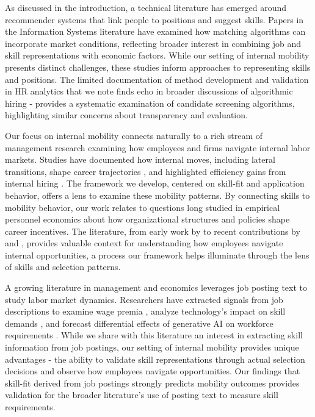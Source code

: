 \documentclass{article}
\begin{document}
As discussed in the introduction, a technical literature has emerged around recommender systems that link people to positions and suggest skills. Papers in the Information Systems literature \parencite{kokkodis2021demand, kokkodis2023good} have examined how matching algorithms can incorporate market conditions, reflecting broader interest in combining job and skill representations with economic factors. While our setting of internal mobility presents distinct challenges, these studies inform approaches to representing skills and positions. The limited documentation of method development and validation in HR analytics that we note finds echo in broader discussions of algorithmic hiring - \parencite{raghavan2020mitigating} provides a systematic examination of candidate screening algorithms, highlighting similar concerns about transparency and evaluation.



Our focus on internal mobility connects naturally to a rich stream of management research examining how employees and firms navigate internal labor markets. Studies have documented how internal moves, including lateral transitions, shape career trajectories \parencite{bidwell2024stepping}, and highlighted efficiency gains from internal hiring \parencite{bidwell2011paying}. The framework we develop, centered on skill-fit and application behavior, offers a lens to examine these mobility patterns. By connecting skills to mobility behavior, our work relates to questions long studied in empirical personnel economics about how organizational structures and policies shape career incentives. The literature, from early work by \textcite{baker1994internal, baker1994wage} to recent contributions by \textcite{tambe2020paying} and \textcite{huitfeldt2023internal}, provides valuable context for understanding how employees navigate internal opportunities, a process our framework helps illuminate through the lens of skills and selection patterns.


A growing literature in management and economics leverages job posting text to study labor market dynamics. Researchers have extracted signals from job descriptions to examine wage premia \parencite{Bana2021}, analyze technology's impact on skill demands \parencite{George2024}, and forecast differential effects of generative AI on workforce requirements \parencite{eloundou2024gpts, 2024_Acemoglu}. While we share with this literature an interest in extracting skill information from job postings, our setting of internal mobility provides unique advantages - the ability to validate skill representations through actual selection decisions and observe how employees navigate opportunities. Our findings that skill-fit derived from job postings strongly predicts mobility outcomes provides validation for the broader literature's use of posting text to measure skill requirements.
\end{document}
